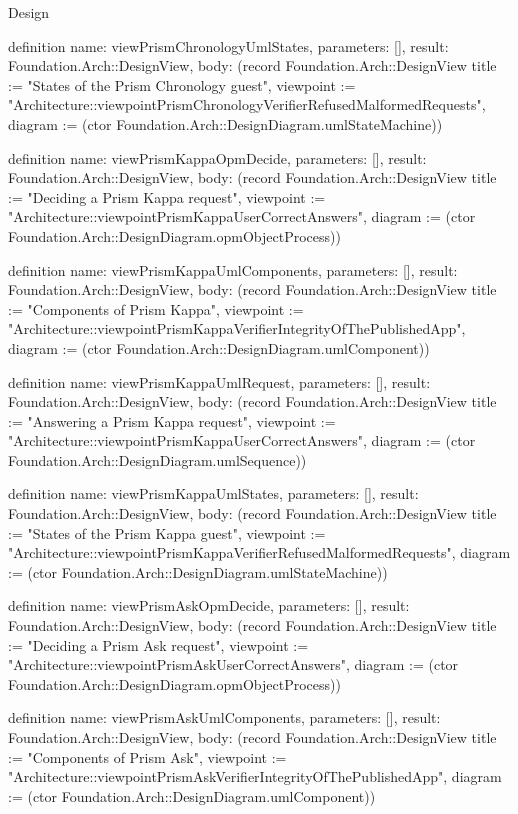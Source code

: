 \begin{lexlean}{Design}
\begin{semanticmodule}
definition{
  name: viewPrismChronologyUmlStates,
  parameters: [],
  result: Foundation.Arch::DesignView,
  body: (record Foundation.Arch::DesignView {title := "States of the Prism Chronology guest", viewpoint := "Architecture::viewpointPrismChronologyVerifierRefusedMalformedRequests", diagram := (ctor Foundation.Arch::DesignDiagram.umlStateMachine)})
}

definition{
  name: viewPrismKappaOpmDecide,
  parameters: [],
  result: Foundation.Arch::DesignView,
  body: (record Foundation.Arch::DesignView {title := "Deciding a Prism Kappa request", viewpoint := "Architecture::viewpointPrismKappaUserCorrectAnswers", diagram := (ctor Foundation.Arch::DesignDiagram.opmObjectProcess)})
}

definition{
  name: viewPrismKappaUmlComponents,
  parameters: [],
  result: Foundation.Arch::DesignView,
  body: (record Foundation.Arch::DesignView {title := "Components of Prism Kappa", viewpoint := "Architecture::viewpointPrismKappaVerifierIntegrityOfThePublishedApp", diagram := (ctor Foundation.Arch::DesignDiagram.umlComponent)})
}

definition{
  name: viewPrismKappaUmlRequest,
  parameters: [],
  result: Foundation.Arch::DesignView,
  body: (record Foundation.Arch::DesignView {title := "Answering a Prism Kappa request", viewpoint := "Architecture::viewpointPrismKappaUserCorrectAnswers", diagram := (ctor Foundation.Arch::DesignDiagram.umlSequence)})
}

definition{
  name: viewPrismKappaUmlStates,
  parameters: [],
  result: Foundation.Arch::DesignView,
  body: (record Foundation.Arch::DesignView {title := "States of the Prism Kappa guest", viewpoint := "Architecture::viewpointPrismKappaVerifierRefusedMalformedRequests", diagram := (ctor Foundation.Arch::DesignDiagram.umlStateMachine)})
}

definition{
  name: viewPrismAskOpmDecide,
  parameters: [],
  result: Foundation.Arch::DesignView,
  body: (record Foundation.Arch::DesignView {title := "Deciding a Prism Ask request", viewpoint := "Architecture::viewpointPrismAskUserCorrectAnswers", diagram := (ctor Foundation.Arch::DesignDiagram.opmObjectProcess)})
}

definition{
  name: viewPrismAskUmlComponents,
  parameters: [],
  result: Foundation.Arch::DesignView,
  body: (record Foundation.Arch::DesignView {title := "Components of Prism Ask", viewpoint := "Architecture::viewpointPrismAskVerifierIntegrityOfThePublishedApp", diagram := (ctor Foundation.Arch::DesignDiagram.umlComponent)})
}


\end{semanticmodule}
\end{lexlean}
